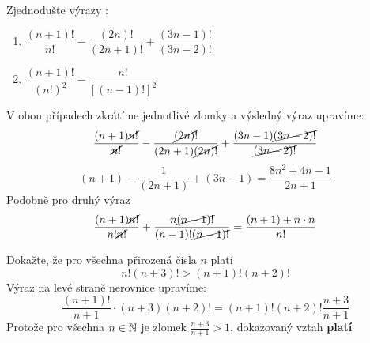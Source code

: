 \begin{mdframed}[style=mdexam]
  \begin{example}\label{mai:exam105a}
    Zjednodušte výrazy \cite[s.~22]{calda2008matematika} :
    \begin{enumerate}[label=\emph{\alph*}),noitemsep]
      \item \(\dfrac{(n+1)!}{n!} - \dfrac{(2n)!}{(2n+1)!} + \dfrac{(3n-1)!}{(3n-2)!}\)
      \item \(\dfrac{(n+1)!}{(n!)^2} - \dfrac{n!}{[(n-1)!]^2}\)
    \end{enumerate}
    V obou případech zkrátíme jednotlivé zlomky a výsledný výraz upravíme:
    \begin{equation*}
      \frac{(n+1)\cancel{n!}}{\cancel{n!}} - \frac{\cancel{(2n)!}}{(2n+1)\cancel{(2n)!}} +
      \frac{(3n-1)\cancel{(3n-2)!}}{\cancel{(3n-2)!}}
    \end{equation*}
    \begin{equation*}
      (n+1) - \frac{1}{(2n+1)} + (3n-1) = \frac{8n^2 + 4n -1}{2n + 1}
    \end{equation*}
    Podobně pro druhý výraz
    \begin{equation*}
      \frac{(n+1)\cancel{n!}}{n!\cancel{n!}} + \frac{n\cancel{(n-1)!}}{(n-1)!\cancel{(n-1)!}} =
      \frac{(n+1)+n\cdot n}{n!}
    \end{equation*}
  \end{example}

  \begin{example}\label{mai:exam105b}
    Dokažte, že pro všechna přirozená čísla \(n\) platí
    \begin{equation*}
      n!(n+3)! > (n+1)!(n+2)!
    \end{equation*}
    Výraz na levé straně nerovnice upravíme:
    \begin{equation*}
      \frac{(n+1)!}{n+1}\cdot(n+3)(n+2)! = (n+1)!(n+2)!\frac{n+3}{n+1}
    \end{equation*}   
    Protože pro všechna \(n\in\mathbb{N}\) je zlomek \(\frac{n+3}{n+1}>1\), dokazovaný vztah
    \textbf{platí}  
  \end{example}
\end{mdframed}